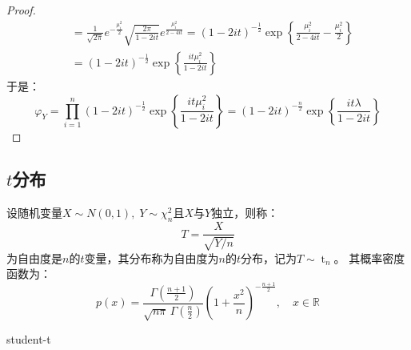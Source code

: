\begin{proof}
\begin{align*}
		&=\frac{1}{\sqrt{2\pi}}e^{-\frac{\mu_i^2}{2}}\sqrt{\frac{2\pi}{1-2it}}e^{\frac{\mu_i^2}{2-4it}}
		=(1-2it)^{-\frac{1}{2}}\exp\left\{\frac{\mu_i^2}{2-4it}-\frac{\mu_i^2}{2}\right\} \\
		&=(1-2it)^{-\frac{1}{2}}\exp\left\{\frac{it\mu_i^2}{1-2it}\right\}
	\end{align*}
	于是：
	\begin{equation*}
		\varphi_{Y}=\prod_{i=1}^n(1-2it)^{-\frac{1}{2}}\exp\left\{\frac{it\mu_i^2}{1-2it}\right\}=(1-2it)^{-\frac{n}{2}}\exp\left\{\frac{it\lambda}{1-2it}\right\}
	\end{equation*}\par
\end{proof}

\subsection{$t$分布}
\begin{definition}
	设随机变量$X\sim N(0,1),\;Y\sim\chi_n^2$且$X$与$Y$独立，则称：
	\begin{equation*}
		T=\frac{X}{\sqrt{Y/ n}}
	\end{equation*}
	为自由度是$n$的$t$变量，其分布称为自由度为$n$的$t$分布，记为$T\sim \operatorname{t}_n$。
	其概率密度函数为：
	\begin{equation*}
		p(x)=\frac{\Gamma\left(\frac{n+1}{2}\right)}{\sqrt{n\pi}\,\Gamma\left(\frac{n}{2}\right)}
		\left(1+\frac{x^2}{n}\right)^{-\frac{n+1}{2}},\quad x\in\mathbb{R}
	\end{equation*}
\end{definition}
\begin{densityplot}{student-t}
	\caption{$t$ 分布 $\operatorname{t}_5$ 的概率密度函数}
\end{densityplot}


